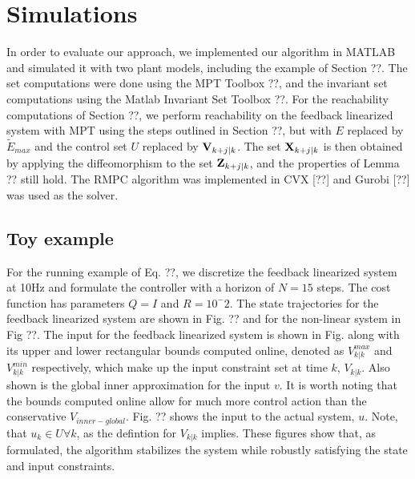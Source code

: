 \section{Simulations}
\label{sec:simulations}

In order to evaluate our approach, we implemented our algorithm in MATLAB and simulated it with two plant models, including the example of Section ??. The set computations were done using the MPT Toolbox ??, and the invariant set computations using the Matlab Invariant Set Toolbox ??. For the reachability computations of Section ??, we perform reachability on the feedback linearized system with MPT using the steps outlined in Section ??, but with $E$ replaced by $\tilde{E}_{max}$ and the control set $U$ replaced by $\mathbf{V}_{k+j|k}$. The set $\mathbf{X}_{k+j|k}$ is then obtained by applying the diffeomorphism to the set $\mathbf{Z}_{k+j|k}$, and the properties of Lemma ?? still hold. The RMPC algorithm was implemented in CVX [??] and Gurobi [??] was used as the solver.

\subsection{Toy example}

For the running example of Eq. ??, we discretize the feedback linearized system at 10Hz and formulate the controller with a horizon of $N=15$ steps. The cost function has parameters $Q=I$ and $R=10^-2$.
The state trajectories for the feedback linearized system are shown in Fig. ?? and for the non-linear system in Fig ??. The input for the feedback linearized system is shown in Fig. along with its upper and lower rectangular bounds computed online, denoted as $ V^{max}_{k|k}$ and $ V^{min}_{k|k}$ respectively, which make up the input constraint set at time $k$, $V_{k|k}$. Also shown is the global inner approximation for the input $v$. It is worth noting that the bounds computed online allow for much more control action than the conservative $V_{inner-global}$. Fig. ?? shows the input to the actual system, $u$. Note, that $u_k \in U \forall k$, as the defintion for $V_{k|k}$ implies. These figures show that, as formulated, the algorithm stabilizes the system while robustly satisfying the state and input constraints.

